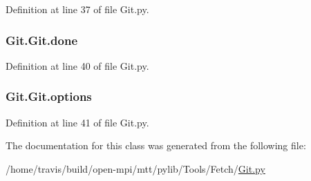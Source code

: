 Definition at line 37 of file Git.\-py.

\hypertarget{classGit_1_1Git_adb8991008d4bb4568fa9c2f991711cda}{
\subsubsection[{done}]{\setlength{\rightskip}{0pt plus 5cm}Git.\-Git.\-done}}\label{classGit_1_1Git_adb8991008d4bb4568fa9c2f991711cda}


Definition at line 40 of file Git.\-py.

\hypertarget{classGit_1_1Git_a7560b88b014c5da8785739c7bb6283ed}{
\subsubsection[{options}]{\setlength{\rightskip}{0pt plus 5cm}Git.\-Git.\-options}}\label{classGit_1_1Git_a7560b88b014c5da8785739c7bb6283ed}


Definition at line 41 of file Git.\-py.



The documentation for this class was generated from the following file\-:\begin{DoxyCompactItemize}
\item 
/home/travis/build/open-\/mpi/mtt/pylib/\-Tools/\-Fetch/\hyperlink{Git_8py}{Git.\-py}\end{DoxyCompactItemize}
